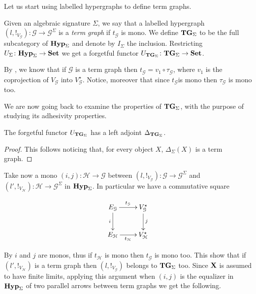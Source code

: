\documentclass[runningheads,envcountsect]{lipics-v2021}
\def\X{\textbf {\textup{X}}}
\newcommand{\catname}[1]{\textbf{\textup{#1}}}
\newcommand{\hyp}{\catname{Hyp}}
\newcommand{\tg}[0]{\catname{TG}_{\Sigma}}
\begin{document}
Let us start using labelled hypergraphs to define term graphs.

\begin{definition}\label{def:tg}
	Given an algebraic signature $\Sigma$, we say that a labelled hypergraph $(l, !_{V_\mathcal{G}})\colon \mathcal{G}\to \mathcal{G}^{\Sigma}$ is a \emph{term graph} if $t_\mathcal{G}$ is mono. We define $\tg$ to be the full subcategory of $\hyp_{\Sigma}$ and denote by $I_\Sigma$ the inclusion. Restricting $U_\Sigma\colon \hyp_{\Sigma}\to \catname{Set}$ we get a forgetful functor $U_{\tg}\colon \tg\to \catname{Set}$.
\end{definition}


\begin{remark}\label{rem:mono2}By , we know that if $\mathcal{G}$ is a term graph then $t_{\mathcal{G}}=v_1\circ \tau_{\mathcal{G}}$, where $v_1$ is the coprojection of $V_{\mathcal{G}}$ into $V^\star_{\mathcal{G}}$.  Notice, moreover that since $t_{\mathcal{G}}$is mono then $\tau_{\mathcal{G}}$ is mono too.
\end{remark}

We are now going back to examine the properties of $\tg$, with the purpose of studying its adhesivity properties.

\begin{proposition}\label{term:left}The forgetful functor $U_{\tg}$ has a left adjoint $\Delta_{\tg}$.
\end{proposition}
\begin{proof}
	This follows noticing that, for every object $X$, $\Delta_{\Sigma}(X)$ is a term graph.   
\end{proof}

Take now a mono $(i,j)\colon \mathcal{H}\to \mathcal{G}$ between  $(l, !_{V_\mathcal{G}})\colon \mathcal{G}\to \mathcal{G}^{\Sigma}$ and $(l', !_{V_\mathcal{H}})\colon \mathcal{H}\to \mathcal{G}^{\Sigma}$ in $\hyp_\Sigma$. In particular we have a commutative square

\[\xymatrix{E_{\mathcal{G}} \ar[r]^{t_{\mathcal{G}}} \ar[d]_{i}& V^\star_{\mathcal{G}} \ar[d]^{j} \\ E_{\mathcal{H}} \ar[r]_{t_{\mathcal{H}}} & V^\star_{\mathcal{H}}}\]

By   $i$ and $j$ are monos, thus if $t_{\mathcal{H}}$ is mono then $t_{\mathcal{G}}$  is mono too. This show that if $(l', !_{V_\mathcal{H}})$ is a term graph then $(l, !_{V_\mathcal{G}})$ belongs to $\tg$ too.  Since $\X$ is assumed to have finite limits, applying this argument when $(i,j)$ is the equalizer in $\hyp_\Sigma$ of two parallel arrows between term graphs we get the following.
\end{document}
